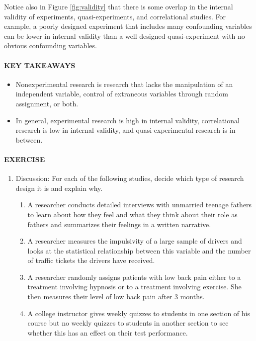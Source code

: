 \documentclass[
]{krantz}
\providecommand{\tightlist}{%
  \setlength{\itemsep}{0pt}\setlength{\parskip}{0pt}}
\begin{document}
Notice also in Figure \ref{fig:validity} that there is some overlap in the internal validity of experiments, quasi-experiments, and correlational studies. For example, a poorly designed experiment that includes many confounding variables can be lower in internal validity than a well designed quasi-experiment with no obvious confounding variables.

\paragraph*{KEY TAKEAWAYS}\label{key-takeaways-18}

\begin{itemize}
\tightlist
\item
  Nonexperimental research is research that lacks the manipulation of an independent variable, control of extraneous variables through random assignment, or both.
\item
  In general, experimental research is high in internal validity, correlational research is low in internal validity, and quasi-experimental research is in between.
\end{itemize}

\paragraph*{EXERCISE}\label{exercise-2}

\begin{enumerate}
\def\labelenumi{\arabic{enumi}.}
\tightlist
\item
  Discussion: For each of the following studies, decide which type of research design it is and explain why.

  \begin{enumerate}
  \def\labelenumii{\alph{enumii}.}
  \tightlist
  \item
    A researcher conducts detailed interviews with unmarried teenage fathers to learn about how they feel and what they think about their role as fathers and summarizes their feelings in a written narrative.
  \item
    A researcher measures the impulsivity of a large sample of drivers and looks at the statistical relationship between this variable and the number of traffic tickets the drivers have received.
  \item
    A researcher randomly assigns patients with low back pain either to a treatment involving hypnosis or to a treatment involving exercise. She then measures their level of low back pain after 3 months.
  \item
    A college instructor gives weekly quizzes to students in one section of his course but no weekly quizzes to students in another section to see whether this has an effect on their test performance.
  \end{enumerate}
\end{enumerate}
\end{document}
